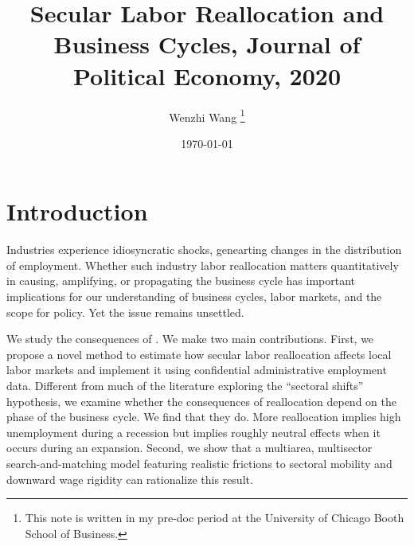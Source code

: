 \documentclass[12pt]{article}
\newcommand{\highlightB}[1]{{\emph{\color{MyBlue}{#1}}}}
\theoremstyle{definition}
\begin{document}
 


\title{\bf Secular Labor Reallocation and Business Cycles, Journal of Political Economy, 2020} 
\author{Wenzhi Wang \thanks{This note is written in my pre-doc period at the University of Chicago Booth School of Business.} } 
\date{\today} 
\maketitle 

\citet{chodorow-reichSecularLaborReallocation2020}

\section{Introduction}

Industries experience idiosyncratic shocks, genearting changes in the distribution of employment. Whether such industry labor reallocation matters quantitatively in causing, amplifying, or propagating the business cycle has important implications for our understanding of business cycles, labor markets, and the scope for policy. Yet the issue remains unsettled.

We study the consequences of \highlightB{secular labor reallocation, defined as the change in an economy's allocation of labor in response to mean-preserving, long-lasting idiosyncratic industry shocks}. We make two main contributions. First, we propose a novel method to estimate how secular labor reallocation affects local labor markets and implement it using confidential administrative employment data. Different from much of the literature exploring the ``sectoral shifts'' hypothesis, we examine whether the consequences of reallocation depend on the phase of the business cycle. We find that they do. More reallocation implies high unemployment during a recession but implies roughly neutral effects when it occurs during an expansion. Second, we show that a multiarea, multisector search-and-matching model featuring realistic frictions to sectoral mobility and downward wage rigidity can rationalize this result. 
\end{document}
